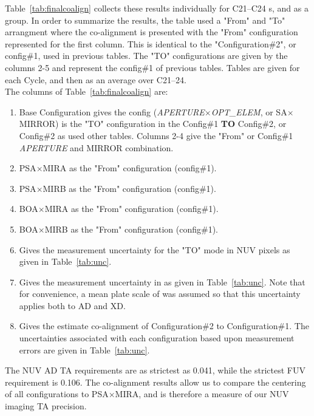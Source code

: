 Table~\ref{tab:finalcoalign} collects these results individually for C21--C24 s, and as a group.
In order to summarize the results, the table used a "From" and "To" arrangment where the co-alignment is presented
with the "From"  configuration represented for the first column. This is identical to the "Configuration\#2",
or config\#1, used in previous tables. The "TO" configurations are given by the columns 2-5 and represent the config\#1 of previous tables.
Tables are given for each Cycle, and then as an average over C21--24. \\

The columns of Table~\ref{tab:finalcoalign} are:
\footnotesize
\begin{enumerate}
\item Base Configuration gives the config (\textit{APERTURE}$\times$\textit{OPT\_ELEM}, or SA$\times$MIRROR) is the "TO" configuration in the Config\#1 {\bf TO} Config\#2, or
Config\#2 as used other tables. Columns 2-4 give the "From" or Config\#1  \textit{APERTURE} and MIRROR combination.
\item PSA$\times$MIRA as the "From" configuration (config\#1).
\item PSA$\times$MIRB as the "From" configuration (config\#1).
\item BOA$\times$MIRA as the "From" configuration (config\#1).
\item BOA$\times$MIRB as the "From" configuration (config\#1).
\item Gives the measurement uncertainty for the "TO" mode in NUV pixels as given in Table~\ref{tab:unc}.
\item Gives the measurement uncertainty in \arcsec as given in Table~\ref{tab:unc}.
Note that for convenience, a mean plate scale of was assumed so that this uncertainty applies both to AD and XD.
\item Gives the estimate co-alignment of Configuration\#2 to Configuration\#1. The uncertainties associated with each  configuration based upon measurement errors are given in Table~\ref{tab:unc}.
\end{enumerate}
\normalsize

The NUV AD TA requirements are as strictest as 0.041\arcsec, while the strictest FUV requirement is 0.106\arcsec.
The co-alignment results allow us to compare the centering of all  configurations to PSA$\times$MIRA,
and is therefore a measure of our NUV imaging TA precision.

